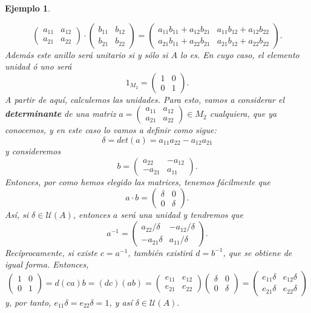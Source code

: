 \documentclass[12pt]{article}
\newtheorem{example}{Ejemplo}[theorem]
\begin{document}
\begin{example}
\begin{enumerate}
$$\left(
\begin{matrix}
a_{11} & a_{12} \\
a_{21} & a_{22}
\end{matrix}
\right) \cdot \left(
\begin{matrix}
b_{11} & b_{12} \\
b_{21} & b_{22}
\end{matrix}
\right) = \left(
\begin{matrix}
a_{11}b_{11} + a_{12}b_{21} & a_{11}b_{12} + a_{12}b_{22}\\
a_{21}b_{11} + a_{22}b_{21} & a_{21}b_{12} + a_{22}b_{22}
\end{matrix}
\right).$$
Además este anillo será unitario si y sólo si $A$ lo es. En cuyo caso, el elemento unidad ó uno será $$1_{M_{2}} =  \left(
\begin{matrix}
1 & 0 \\
0 & 1
\end{matrix} 
\right).$$ A partir de aquí, calculemos las unidades. Para esto, vamos a considerar el \textbf{determinante} de una matriz $a =\left(
\begin{matrix}
a_{11} & a_{12} \\
a_{21} & a_{22}
\end{matrix}
\right) \in M_{2}$ cualquiera, que ya conocemos, y en este caso lo vamos a definir como sigue: $$\delta = det(a) =a_{11}a_{22} -a_{12}a_{21}$$ y consideremos $$b = \left(
\begin{matrix}
a_{22} & -a_{12} \\
-a_{21} & a_{11}
\end{matrix}
\right).$$ Entonces, por como hemos elegido las matrices, tenemos fácilmente que $$a\cdot b = \left(
\begin{matrix}
\delta & 0 \\
0 & \delta
\end{matrix}
\right).$$ Así, si $\delta \in \mathcal{U}(A)$, entonces $a$ será una unidad y tendremos que $$a^{-1} = \left(
\begin{matrix}
a_{22}/\delta & -a_{12}/\delta \\
-a_{21}\delta & a_{11}/\delta
\end{matrix}
\right).$$ Recíprocamente, si existe $c = a^{-1}$, también existirá $d = b^{-1}$, que se  obtiene de igual forma. Entonces, $$\left(
\begin{matrix}
1 & 0 \\
0 & 1
\end{matrix} 
\right) = d(ca)b = (dc)(ab) = \left( \begin{matrix}
e_{11} & e_{12} \\
e_{21} & e_{22}
\end{matrix}
\right) \left( \begin{matrix}
\delta & 0 \\
0 & \delta
\end{matrix}
\right) = \left( \begin{matrix}
e_{11}\delta & e_{12}\delta \\
e_{21}\delta & e_{22}\delta
\end{matrix}
\right)$$ y, por tanto, $e_{11}\delta = e_{22}\delta = 1$, y así $\delta \in \mathcal{U}(A).$


\end{enumerate}
\end{example}
\end{document}
